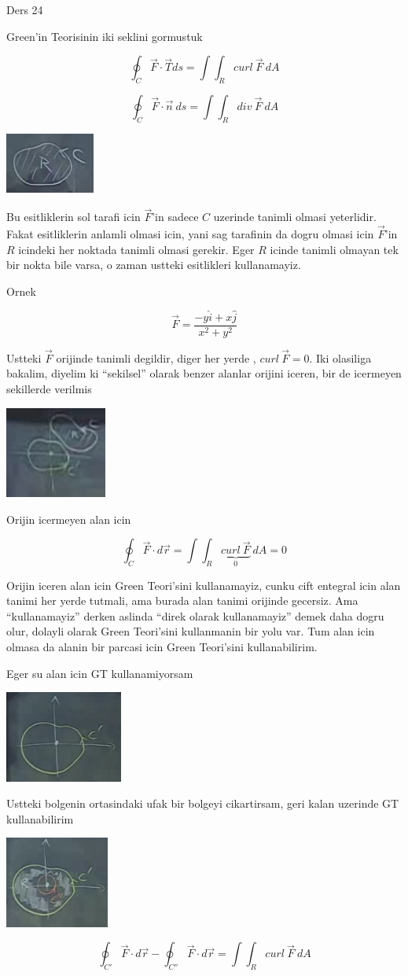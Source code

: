\documentclass[12pt,fleqn]{article}
\begin{document}
Ders 24

Green'in Teorisinin iki seklini gormustuk

\[ \oint_C \vec{F} \cdot \vec{T} ds = \int \int_R curl \ \vec{F} \ dA \]

\[ \oint_C \vec{F} \cdot \vec{n} \ ds = \int \int_R div \ \vec{F} \ dA \]


\includegraphics[height=2cm]{24_1.png}

Bu esitliklerin sol tarafi icin $\vec{F}$'in sadece $C$ uzerinde tanimli
olmasi yeterlidir. Fakat esitliklerin anlamli olmasi icin, yani sag
tarafinin da dogru olmasi icin $\vec{F}$'in $R$ icindeki her noktada tanimli
olmasi gerekir. Eger $R$ icinde tanimli olmayan tek bir nokta bile varsa, o
zaman ustteki esitlikleri kullanamayiz.

Ornek 

\[ \vec{F} = \frac{ -y\hat{i} + x\hat{j}}{x^2+y^2} \]

Ustteki $\vec{F}$ orijinde tanimli degildir, diger her yerde , $curl \
\vec{F} = 0$. 
Iki olasiliga bakalim, diyelim ki ``sekilsel'' olarak benzer alanlar orijini
iceren, bir de icermeyen sekillerde verilmis

\includegraphics[height=3cm]{24_2.png}

Orijin icermeyen alan icin

\[ \oint_C \vec{F} \cdot d\vec{r} = 
\int \int_R \underbrace{curl \ \vec{F}}_{0} \ dA  = 0
\]
 
Orijin iceren alan icin Green Teori'sini kullanamayiz, cunku cift entegral
icin alan tanimi her yerde tutmali, ama burada alan tanimi orijinde
gecersiz. Ama ``kullanamayiz'' derken aslinda ``direk olarak kullanamayiz''
demek daha dogru olur, dolayli olarak Green Teori'sini kullanmanin bir yolu
var. Tum alan icin olmasa da alanin bir parcasi icin Green Teori'sini
kullanabilirim. 

Eger su alan icin GT kullanamiyorsam

\includegraphics[height=3cm]{24_3.png}

Ustteki bolgenin ortasindaki ufak bir bolgeyi cikartirsam, geri kalan
uzerinde GT kullanabilirim

\includegraphics[height=3cm]{24_4.png}


\[ \oint_{C'} \vec{F} \cdot d\vec{r} - 
\oint_{C''} \vec{F} \cdot d\vec{r}  =
\int \int_R curl \ \vec{F} \ dA 
\]
 
\end{document}
